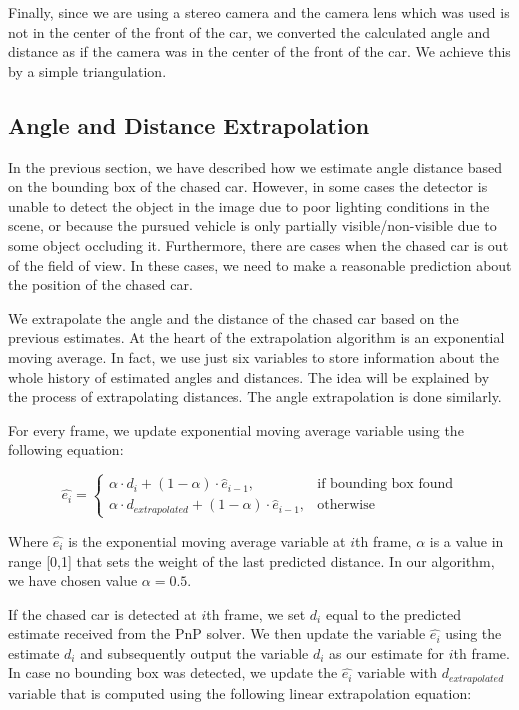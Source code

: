 \documentclass{ctuthesis/ctuthesis}
\begin{document}
Finally, since we are using a stereo camera and the camera lens which was used is not in the center of the front of the car, we converted the calculated angle and distance as if the camera was in the center of the front of the car. We achieve this by a simple triangulation.

\subsection{Angle and Distance Extrapolation}
In the previous section, we have described how we estimate angle distance based on the bounding box of the chased car. However, in some cases the detector is unable to detect the object in the image due to poor lighting conditions in the scene, or because the pursued vehicle is only partially visible/non-visible due to some object occluding it. Furthermore, there are cases when the chased car is out of the field of view. In these cases, we need to make a reasonable prediction about the position of the chased car. \par


We extrapolate the angle and the distance of the chased car based on the previous estimates. At the heart of the extrapolation algorithm is an exponential moving average. In fact, we use just six variables to store information about the whole history of estimated angles and distances. The idea will be explained by the process of extrapolating distances. The angle extrapolation is done similarly. \par


For every frame, we update exponential moving average variable using the following equation:\par


\begin{equation}
    \hat{e_{i}}=
    \begin{cases}
      \alpha\cdot d_i + (1-\alpha)\cdot \hat{e}_{i-1}, & \text{if bounding box found} \\
      \alpha\cdot d_{extrapolated} + (1-\alpha)\cdot \hat{e}_{i-1}, & \text{otherwise}
    \end{cases}
\end{equation}

Where $\hat{e_{i}}$ is the exponential moving average variable at $i$th frame, $\alpha$ is a value in range [0,1] that sets the weight of the last predicted distance. In our algorithm, we have chosen value $\alpha=0.5$. \par

If the chased car is detected at $i$th frame, we set $d_i$ equal to the predicted estimate received from the PnP solver. We then update the variable $\hat{e_{i}}$ using the estimate $d_i$ and subsequently output the variable $d_i$ as our estimate for $i$th frame. In case no bounding box was detected, we update the $\hat{e_{i}}$ variable with $d_{extrapolated}$ variable that is computed using the following linear extrapolation equation:
\end{document}
